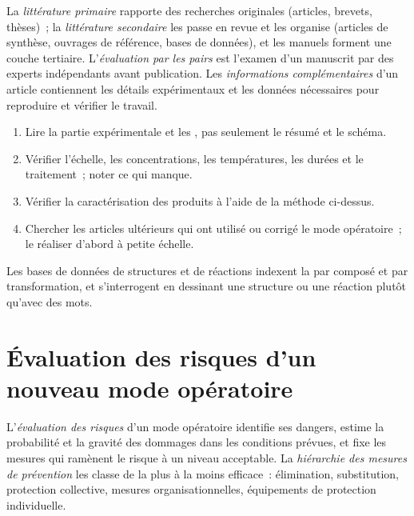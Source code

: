\begin{definition}[La littérature]\label{def:b3:lab-techniques-3:literature}
La \emph{littérature primaire} rapporte des
recherches originales (articles, brevets, thèses)~; la \emph{littérature secondaire} les passe en revue et les organise (articles de
synthèse, ouvrages de référence, bases de données), et les manuels forment
une couche tertiaire. L'\emph{évaluation par les pairs} est l'examen d'un manuscrit par des
experts indépendants avant publication. Les \emph{informations complémentaires}
d'un article contiennent les détails expérimentaux et les données
nécessaires pour reproduire et vérifier le travail.
\end{definition}

\begin{method}\label{met:b3:lab-techniques-3:read-paper}
\begin{enumerate}
  \item Lire la partie expérimentale et les ,
        pas seulement le résumé et le schéma.
  \item Vérifier l'échelle, les concentrations, les températures, les
        durées et le traitement~; noter ce qui manque.
  \item Vérifier la caractérisation des produits à l'aide de la méthode
        ci-dessus.
  \item Chercher les articles ultérieurs qui ont utilisé ou corrigé le mode
        opératoire~; le réaliser d'abord à petite échelle.
\end{enumerate}
\end{method}

Les bases de données de structures et de réactions indexent la  par composé et par transformation, et s'interrogent en dessinant
une structure ou une réaction plutôt qu'avec des mots.

\section{Évaluation des risques d'un nouveau mode opératoire}

\begin{definition}\label{def:b3:lab-techniques-3:assessment}
L'\emph{évaluation des risques} d'un mode opératoire identifie
ses dangers, estime la probabilité et la gravité des dommages dans les
conditions prévues, et fixe les mesures qui ramènent le risque à un niveau
acceptable. La \emph{hiérarchie des mesures de prévention} les classe de la plus à la
moins efficace~: élimination, substitution, protection collective,
mesures organisationnelles, équipements de protection individuelle.
\end{definition}


